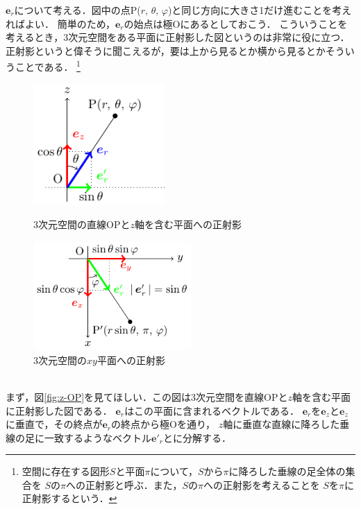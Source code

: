 $\bm{e}_r$について考える．図中の点P($r, \, \theta , \, \varphi$)と同じ方向に大きさ1だけ進むことを考えればよい．
簡単のため，$\bm{e}_r$の始点は極Oにあるとしておこう．
こういうことを考えるとき，3次元空間をある平面に正射影した図というのは非常に役に立つ．
正射影というと偉そうに聞こえるが，要は上から見るとか横から見るとかそういうことである．
\footnote{空間に存在する図形$S$と平面$\pi$について，$S$から$\pi$に降ろした垂線の足全体の集合を
$S$の$\pi$への正射影と呼ぶ．また，$S$の$\pi$への正射影を考えることを
$S$を$\pi$に正射影するという．}
\begin{figure}[h]
 \begin{minipage}{0.5\hsize}
  \begin{center}
   \includegraphics[width=5cm]{picture/vecter24}
  \end{center}
 \caption{3次元空間の直線OPと$z$軸を含む平面への正射影}
 \label{fig:z-OP}
\end{minipage}
\begin{minipage}{0.5\hsize}
  \begin{center}
   \includegraphics[width=6cm]{picture/vecter25}
  \end{center}
 \caption{3次元空間の$xy$平面への正射影}
 \label{fig:3dxy}
\end{minipage}
\end{figure} \\
まず，図\ref{fig:z-OP}を見てほしい．この図は3次元空間を直線OPと$z$軸を含む平面に正射影した図である．
$\bm{e}_r$はこの平面に含まれるベクトルである．
$\bm{e}_r$を$\bm{e}_z$と$\bm{e}_z$に垂直で，その終点が$\bm{e}_r$の終点から極Oを通り，
$z$軸に垂直な直線に降ろした垂線の足に一致するようなベクトル$\bm{e}'_r$とに分解する．
